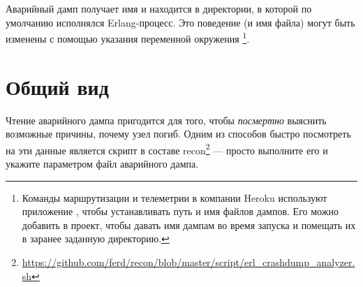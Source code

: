 \documentclass[11pt, oneside]{book}   	%
\begin{document}
Аварийный дамп получает имя  и находится в директории, в которой по умолчанию исполнялся Erlang-процесс. Это поведение (и имя файла) могут быть изменены с помощью указания переменной окружения \footnote{Команды маршрутизации и телеметрии в компании Heroku используют приложение , чтобы устанавливать путь и имя файлов дампов. Его можно добавить в проект, чтобы давать имя дампам во время запуска и помещать их в заранее заданную директорию.}.


\section{Общий вид}
\label{sec:crashdump-general-view}

Чтение аварийного дампа пригодится для того, чтобы \emph{посмертно} выяснить возможные причины, почему узел погиб. Одним из способов быстро посмотреть на эти данные является скрипт  в составе recon\footnote{\href{https://github.com/ferd/recon/blob/master/script/erl\_crashdump\_analyzer.sh}{https://github.com/ferd/recon/blob/master/script/erl\_crashdump\_analyzer.sh}} --- просто выполните его и укажите параметром файл аварийного дампа.
\end{document}
